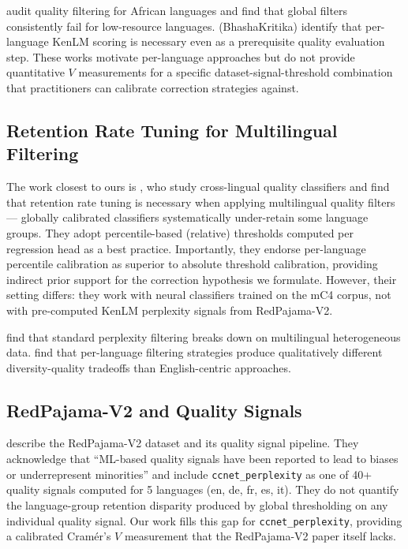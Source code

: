 \citet{Adelani2023Better} audit quality filtering for African languages and find that global filters consistently fail for low-resource languages. \citet{Niyomugabo2025BhashaKritika} (BhashaKritika) identify that per-language KenLM scoring is necessary even as a prerequisite quality evaluation step. These works motivate per-language approaches but do not provide quantitative $V$ measurements for a specific dataset-signal-threshold combination that practitioners can calibrate correction strategies against.

\subsection{Retention Rate Tuning for Multilingual Filtering}

The work closest to ours is \citet{Turki2026CrossLingual}, who study cross-lingual quality classifiers and find that retention rate tuning is necessary when applying multilingual quality filters --- globally calibrated classifiers systematically under-retain some language groups. They adopt percentile-based (relative) thresholds computed per regression head as a best practice. Importantly, they endorse per-language percentile calibration as superior to absolute threshold calibration, providing indirect prior support for the correction hypothesis we formulate. However, their setting differs: they work with neural classifiers trained on the mC4 corpus, not with pre-computed KenLM perplexity signals from RedPajama-V2.

\citet{Jansen2022Perplexed} find that standard perplexity filtering breaks down on multilingual heterogeneous data. \citet{Singh2024Repetition} find that per-language filtering strategies produce qualitatively different diversity-quality tradeoffs than English-centric approaches.

\subsection{RedPajama-V2 and Quality Signals}

\citet{Weber2024RedPajama} describe the RedPajama-V2 dataset and its quality signal pipeline. They acknowledge that ``ML-based quality signals have been reported to lead to biases or underrepresent minorities'' and include \texttt{ccnet\_perplexity} as one of 40+ quality signals computed for 5 languages (en, de, fr, es, it). They do not quantify the language-group retention disparity produced by global thresholding on any individual quality signal. Our work fills this gap for \texttt{ccnet\_perplexity}, providing a calibrated Cram{\'e}r's $V$ measurement that the RedPajama-V2 paper itself lacks.

